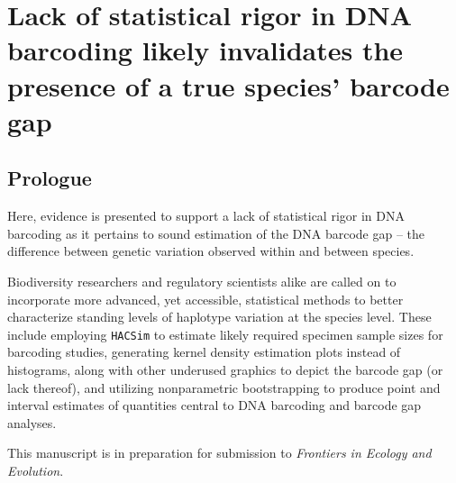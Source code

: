 \linespread{1.0}

\chapter{Lack of statistical rigor in DNA barcoding likely invalidates the presence of a true species' barcode gap}


\vspace{\fill}


\section{Prologue}

Here, evidence is presented to support a lack of statistical rigor in DNA barcoding as it pertains to sound estimation of the DNA barcode gap -- the difference between genetic variation observed within and between species. 



Biodiversity researchers and regulatory scientists alike are called on to incorporate more advanced, yet accessible, statistical methods to better characterize standing levels of haplotype variation at the species level. These include employing {\tt HACSim} to estimate likely required specimen sample sizes for barcoding studies, generating kernel density estimation plots instead of histograms, along with other underused graphics to depict the barcode gap (or lack thereof), and utilizing nonparametric bootstrapping to produce point and interval estimates of quantities central to DNA barcoding and barcode gap analyses.



This manuscript is in preparation for submission to \textit{Frontiers in Ecology and Evolution}.  

